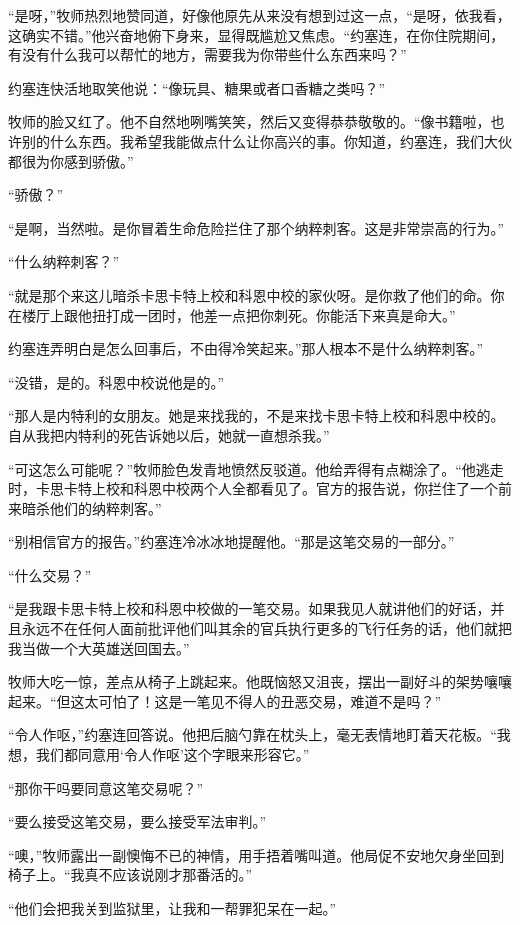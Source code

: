     “是呀，”牧师热烈地赞同道，好像他原先从来没有想到过这一点，“是呀，依我看，这确实不错。”他兴奋地俯下身来，显得既尴尬又焦虑。“约塞连，在你住院期间，有没有什么我可以帮忙的地方，需要我为你带些什么东西来吗？”

    约塞连快活地取笑他说：“像玩具、糖果或者口香糖之类吗？”

    牧师的脸又红了。他不自然地咧嘴笑笑，然后又变得恭恭敬敬的。“像书籍啦，也许别的什么东西。我希望我能做点什么让你高兴的事。你知道，约塞连，我们大伙都很为你感到骄傲。”

    “骄傲？”

    “是啊，当然啦。是你冒着生命危险拦住了那个纳粹刺客。这是非常崇高的行为。”

    “什么纳粹刺客？”

    “就是那个来这儿暗杀卡思卡特上校和科恩中校的家伙呀。是你救了他们的命。你在楼厅上跟他扭打成一团时，他差一点把你刺死。你能活下来真是命大。”

    约塞连弄明白是怎么回事后，不由得冷笑起来。”那人根本不是什么纳粹刺客。”

    “没错，是的。科恩中校说他是的。”

    “那人是内特利的女朋友。她是来找我的，不是来找卡思卡特上校和科恩中校的。自从我把内特利的死告诉她以后，她就一直想杀我。”

    “可这怎么可能呢？”牧师脸色发青地愤然反驳道。他给弄得有点糊涂了。“他逃走时，卡思卡特上校和科恩中校两个人全都看见了。官方的报告说，你拦住了一个前来暗杀他们的纳粹刺客。”

    “别相信官方的报告。”约塞连冷冰冰地提醒他。“那是这笔交易的一部分。”

    “什么交易？”

    “是我跟卡思卡特上校和科恩中校做的一笔交易。如果我见人就讲他们的好话，并且永远不在任何人面前批评他们叫其余的官兵执行更多的飞行任务的话，他们就把我当做一个大英雄送回国去。”

    牧师大吃一惊，差点从椅子上跳起来。他既恼怒又沮丧，摆出一副好斗的架势嚷嚷起来。“但这太可怕了！这是一笔见不得人的丑恶交易，难道不是吗？”

    “令人作呕，”约塞连回答说。他把后脑勺靠在枕头上，毫无表情地盯着天花板。“我想，我们都同意用‘令人作呕’这个字眼来形容它。”

    “那你干吗要同意这笔交易呢？”

    “要么接受这笔交易，要么接受军法审判。”

    “噢，”牧师露出一副懊悔不已的神情，用手捂着嘴叫道。他局促不安地欠身坐回到椅子上。“我真不应该说刚才那番活的。”

    “他们会把我关到监狱里，让我和一帮罪犯呆在一起。”

